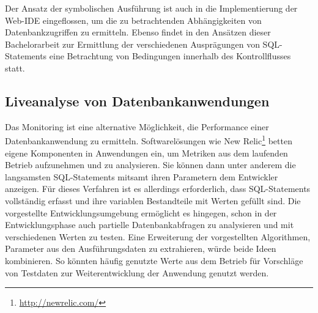 Der Ansatz der symbolischen Ausführung ist auch in die Implementierung der Web-IDE eingeflossen, um die zu betrachtenden Abhängigkeiten von Datenbankzugriffen zu ermitteln.
Ebenso findet in den Ansätzen dieser Bachelorarbeit zur Ermittlung der verschiedenen Ausprägungen von SQL-Statements eine Betrachtung von Bedingungen innerhalb des Kontrollflusses statt.

\subsection{Liveanalyse von Datenbankanwendungen}
Das Monitoring ist eine alternative Möglichkeit, die Performance einer Datenbankanwendung zu ermitteln.
Softwarelösungen wie New Relic\footnote{\url{http://newrelic.com/}} betten eigene Komponenten in Anwendungen ein, um Metriken aus dem laufenden Betrieb aufzunehmen und zu analysieren.
Sie können dann unter anderem die langsamsten SQL-Statements mitsamt ihren Parametern dem Entwickler anzeigen.
Für dieses Verfahren ist es allerdings erforderlich, dass SQL-Statements vollständig erfasst und ihre variablen Bestandteile mit Werten gefüllt sind.
Die vorgestellte Entwicklungsumgebung ermöglicht es hingegen, schon in der Entwicklungsphase auch partielle Datenbankabfragen zu analysieren und mit verschiedenen Werten zu testen.
Eine Erweiterung der vorgestellten Algorithmen, Parameter aus den Ausführungsdaten zu extrahieren, würde beide Ideen kombinieren.
So könnten häufig genutzte Werte aus dem Betrieb für Vorschläge von Testdaten zur Weiterentwicklung der Anwendung genutzt werden.

